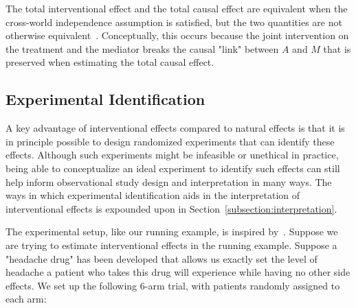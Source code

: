 The total interventional effect and the total causal effect are equivalent when the cross-world independence
assumption is satisfied, but the two quantities are not otherwise equivalent~\citep{vanderweeleetal2014}.
Conceptually, this occurs because the joint intervention on the treatment and the mediator breaks the 
causal "link" between $A$ and $M$ that is preserved when estimating the total causal effect.

\subsection{Experimental Identification}

A key advantage of interventional effects compared to natural effects is that it is in principle possible to 
design randomized experiments that can identify these effects. Although such experiments might be infeasible 
or unethical in practice, being able to conceptualize an ideal experiment to identify such effects can still
help inform observational study design and interpretation in many ways. The ways in which experimental 
identification aids in the interpretation of interventional effects is expounded upon in 
Section~\ref{subsection:interpretation}. 

The experimental setup, like our running example, is inspired by~\cite{morenobetancur2018}. Suppose we 
are trying to estimate interventional effects in the running example. Suppose a "headache drug" has been developed 
that allows us exactly set the level of headache a patient who takes this drug will experience while having no 
other side effects. We set up the following 6-arm trial, with patients randomly assigned to each arm: 

